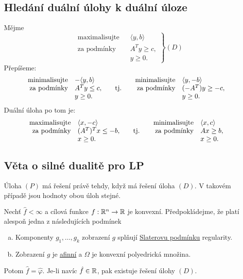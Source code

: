 \subsection{Hledání duální úlohy k duální úloze}
Mějme
\[
    \left.\begin{aligned}
        &\text{maximalisujte}&& \langle y,b \rangle \\
        &\text{za podmínky}  && A^Ty \geq c, \\
        &                    && y \geq 0.
    \end{aligned}
    \right\} (D)
\]
Přepíšeme:
\[
    \begin{array}{r@{\quad}l@{\qquad}c@{\qquad}r@{\quad}l}
    \text{minimalisujte}& -\langle y, b \rangle&           &\text{minimalisujte}& \langle y, -b \rangle \\
    \text{za podmínky}  & A^T y \leq c,        & \text{tj.}&\text{za podmínky}  & (-A^T) y \geq -c, \\
                        & y \geq 0.            &           &                    & y \geq 0.
    \end{array}
\]
Duální úloha po tom je:
\[
    \begin{array}{r@{\quad}l@{\qquad}c@{\qquad}r@{\quad}l}
        \text{maximalisujte}& \langle x,-c \rangle&           & \text{minimalisujte}& \langle x,c \rangle \\
        \text{za podmínky}  &(A^T)^Tx \leq -b,    & \text{tj.}&\text{za podmínky}   & Ax \geq b, \\
                            & x \geq 0.           &           &                     & x \geq 0.
    \end{array}
\]

\subsection{Věta o silné dualitě pro LP}
Úloha $(P)$ má řešení právě tehdy, když má řešení úloha $(D)$. V takovém případě jsou hodnoty obou úloh stejné.

Nechť $\hat f < \infty$ a cílová funkce $f : \mathbb{R}^n \rightarrow \mathbb{R}$ je konvexní. Předpokládejme, že platí alespoň jedna z 
následujících podmínek
\begin{enumerate}[(a)]
    \item Komponenty $g_1, \dots, g_k$ zobrazení $g$ splňují \hyperref[slaterPodm]{Slaterovu podmínku} regularity.
    \item Zobrazení $g$ je \hyperref[sec:afin]{afinní} a $\Omega$ je konvexní polyedrická množina.  
\end{enumerate}
Potom $\hat f = \hat \varphi$. Je-li navíc $\hat f \in \mathbb{R}$, pak existuje řešení úlohy $(D)$.

